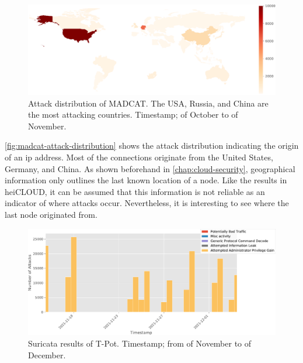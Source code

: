 \begin{figure}[htbp]
    \centering
    \includegraphics[width=\textwidth]{figures/madcat-overview-map.pdf}
    \caption[Attack distribution of MADCAT]{
        Attack distribution of MADCAT.
        The USA, Russia, and China are the most attacking countries.
        Timestamp;  of October to  of November.
    }
    \label{fig:madcat-attack-distribution}
\end{figure}

\autoref{fig:madcat-attack-distribution} shows the attack distribution indicating the origin of an \ac{ip} address.
Most of the connections originate from the United States, Germany, and China.
As shown beforehand in \autoref{chap:cloud-security}, geographical information only outlines the last known location of a node.
Like the results in heiCLOUD, it can be assumed that this information is not reliable as an indicator of where attacks occur.
Nevertheless, it is interesting to see where the last node originated from.

\begin{figure}[htbp]
    \centering
    \includegraphics[width=\textwidth]{figures/madcat-suricata-alerts.pdf}
    \caption[Suricata results of T-Pot]{
        Suricata results of T-Pot.
        Timestamp; from  of November to  of December.
    }
    \label{fig:suricata-distribution}
\end{figure}

